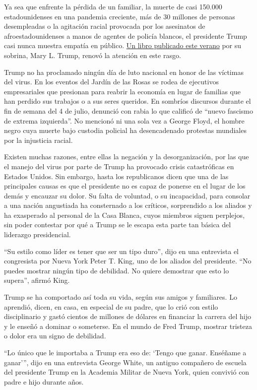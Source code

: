 Ya sea que enfrente la pérdida de un familiar, la muerte de casi 150.000
estadounidenses en una pandemia creciente, más de 30 millones de
personas desempleadas o la agitación racial provocada por los asesinatos
de afroestadounidenses a manos de agentes de policía blancos, el
presidente Trump casi nunca muestra empatía en público.
\href{https://www.nytimes3xbfgragh.onion/es/2020/07/09/espanol/mundo/libro-mary-trump-sobrina.html}{Un
libro publicado este verano} por su sobrina, Mary L. Trump, renovó la
atención en este rasgo.

Trump no ha proclamado ningún día de luto nacional en honor de las
víctimas del virus. En los eventos del Jardín de las Rosas se rodea de
ejecutivos empresariales que presionan para reabrir la economía en lugar
de familias que han perdido sus trabajos o a sus seres queridos. En
sombríos discursos durante el fin de semana del 4 de julio, denunció con
rabia lo que calificó de ``nuevo fascismo de extrema izquierda''. No
mencionó ni una sola vez a George Floyd, el hombre negro cuya muerte
bajo custodia policial ha desencadenado protestas mundiales por la
injusticia racial.

Existen muchas razones, entre ellas la negación y la desorganización,
por las que el manejo del virus por parte de Trump ha provocado crisis
catastróficas en Estados Unidos. Sin embargo, hasta los republicanos
dicen que una de las principales causas es que el presidente no es capaz
de ponerse en el lugar de los demás y encauzar su dolor. Su falta de
voluntad, o su incapacidad, para consolar a una nación angustiada ha
consternado a los críticos, sorprendido a los aliados y ha exasperado al
personal de la Casa Blanca, cuyos miembros siguen perplejos, sin poder
contestar por qué a Trump se le escapa esta parte tan básica del
liderazgo presidencial.

``Su estilo como líder es tener que ser un tipo duro'', dijo en una
entrevista el congresista por Nueva York Peter T. King, uno de los
aliados del presidente. ``No puedes mostrar ningún tipo de debilidad. No
quiere demostrar que esto lo supera'', afirmó King.

Trump se ha comportado así toda su vida, según sus amigos y familiares.
Lo aprendió, dicen, en casa, en especial de su padre, que lo crió con
estilo disciplinario y gastó cientos de millones de dólares en financiar
la carrera del hijo y le enseñó a dominar o someterse. En el mundo de
Fred Trump, mostrar tristeza o dolor era un signo de debilidad.

``Lo único que le importaba a Trump era eso de: `Tengo que ganar.
Enséñame a ganar''', dijo en una entrevista George White, un antiguo
compañero de escuela del presidente Trump en la Academia Militar de
Nueva York, quien convivió con padre e hijo durante años.

